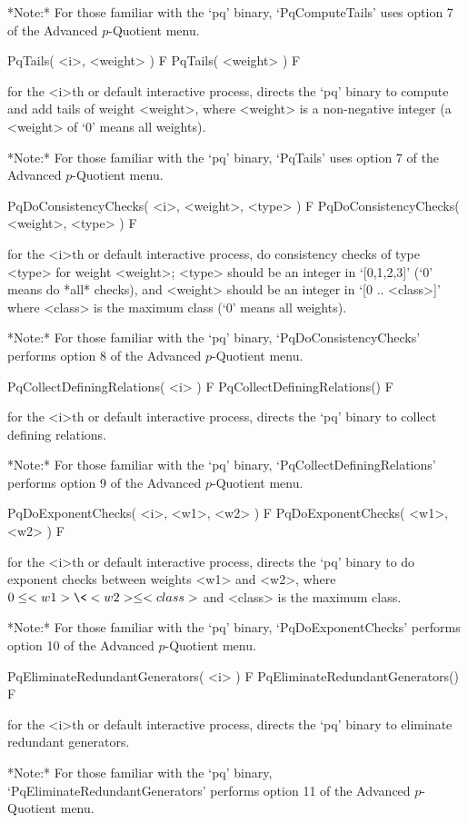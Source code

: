 *Note:*
For those familiar with the `pq' binary, `PqComputeTails' uses  option  7
of the Advanced $p$-Quotient menu.

\>PqTails( <i>, <weight> ) F
\>PqTails( <weight> ) F

for the <i>th or default interactive {\ANUPQ} process, directs  the  `pq'
binary to compute and add tails of weight <weight>, where <weight>  is  a
non-negative integer (a <weight> of `0' means all weights).

*Note:*
For those familiar with the `pq' binary, `PqTails' uses option 7  of  the
Advanced $p$-Quotient menu.

\>PqDoConsistencyChecks( <i>, <weight>, <type> ) F
\>PqDoConsistencyChecks( <weight>, <type> ) F

for the <i>th or default interactive  {\ANUPQ}  process,  do  consistency
checks of type <type> for weight <weight>; <type> should be an integer in
`[0,1,2,3]' (`0' means do  *all*  checks),  and  <weight>  should  be  an
integer in `[0 .. <class>]' where <class> is the maximum class (`0' means
all weights).

*Note:*
For those familiar with the `pq' binary, `PqDoConsistencyChecks' performs
option 8 of the Advanced $p$-Quotient menu.

\>PqCollectDefiningRelations( <i> ) F
\>PqCollectDefiningRelations() F

for the <i>th or default interactive {\ANUPQ} process, directs  the  `pq'
binary to collect defining relations.

*Note:*
For those familiar with  the  `pq'  binary,  `PqCollectDefiningRelations'
performs option 9 of the Advanced $p$-Quotient menu.

\>PqDoExponentChecks( <i>, <w1>, <w2> ) F
\>PqDoExponentChecks( <w1>, <w2> ) F

for the <i>th or default interactive {\ANUPQ} process, directs  the  `pq'
binary to do exponent checks between weights <w1> and <w2>, where $0  \le
<w1> \< <w2> \le <class>$ and <class> is the maximum class.

*Note:*
For those familiar with the `pq'  binary,  `PqDoExponentChecks'  performs
option 10 of the Advanced $p$-Quotient menu.

\>PqEliminateRedundantGenerators( <i> ) F
\>PqEliminateRedundantGenerators() F

for the <i>th or default interactive {\ANUPQ} process, directs  the  `pq'
binary to eliminate redundant generators.

*Note:* 
For those familiar with the `pq' binary, `PqEliminateRedundantGenerators'
performs option 11 of the Advanced $p$-Quotient menu.


